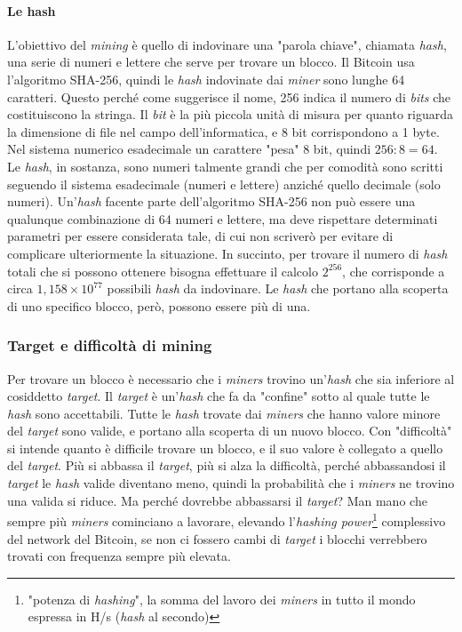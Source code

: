 \documentclass {article}
\begin{document}
\paragraph {Le hash}

L'obiettivo del \textit{mining} è quello di indovinare una "parola chiave", chiamata \textit{hash}, una serie di numeri e lettere che serve per trovare un blocco.
Il Bitcoin usa l'algoritmo SHA-256, quindi le \textit{hash} indovinate dai \textit{miner} sono lunghe 64 caratteri.
Questo perché come suggerisce il nome, 256 indica il numero di \textit{bits} che costituiscono la stringa.
Il \textit{bit} è la più piccola unità di misura per quanto riguarda la dimensione di file nel campo dell'informatica, e 8 bit corrispondono a 1 byte.
Nel sistema numerico esadecimale un carattere "pesa" 8 bit, quindi $256 : 8 = 64$.
Le \textit{hash}, in sostanza, sono numeri talmente grandi che per comodità sono scritti seguendo il sistema esadecimale (numeri e lettere) anziché quello decimale (solo numeri).
Un'\textit{hash} facente parte dell'algoritmo SHA-256 non può essere una qualunque combinazione di 64 numeri e lettere, ma deve rispettare determinati parametri per essere considerata tale, di cui non scriverò per evitare di complicare ulteriormente la situazione.
In succinto, per trovare il numero di \textit{hash} totali che si possono ottenere bisogna effettuare il  calcolo $2^{256}$, che corrisponde a circa $1,158 \times 10^{77}$ possibili \textit{hash} da indovinare.
Le \textit{hash} che portano alla scoperta di uno specifico blocco, però, possono essere più di una.

\subsubsection {Target e difficoltà di mining}

Per trovare un blocco è necessario che i \textit{miners} trovino un'\textit{hash} che sia inferiore al cosiddetto \textit{target}. Il \textit{target} è un'\textit{hash} che fa da "confine" sotto al quale tutte le \textit{hash} sono accettabili.
Tutte le \textit{hash} trovate dai \textit{miners} che hanno valore minore del \textit{target} sono valide, e portano alla scoperta di un nuovo blocco.
Con "difficoltà" si intende quanto è difficile trovare un blocco, e il suo valore è collegato a quello del \textit{target}.
Più si abbassa il \textit{target}, più si alza la difficoltà, perché abbassandosi il \textit{target} le \textit{hash} valide diventano meno, quindi la probabilità che i \textit{miners} ne trovino una valida si riduce.
Ma perché dovrebbe abbassarsi il \textit{target}?
Man mano che sempre più \textit{miners} cominciano a lavorare, elevando l'\textit{hashing power}\footnote{"potenza di \textit{hashing}", la somma del lavoro dei \textit{miners} in tutto il mondo espressa in H/s (\textit{hash} al secondo)} complessivo del network del Bitcoin, se non ci fossero cambi di \textit{target} i blocchi verrebbero trovati con frequenza sempre più elevata.
\end{document}
